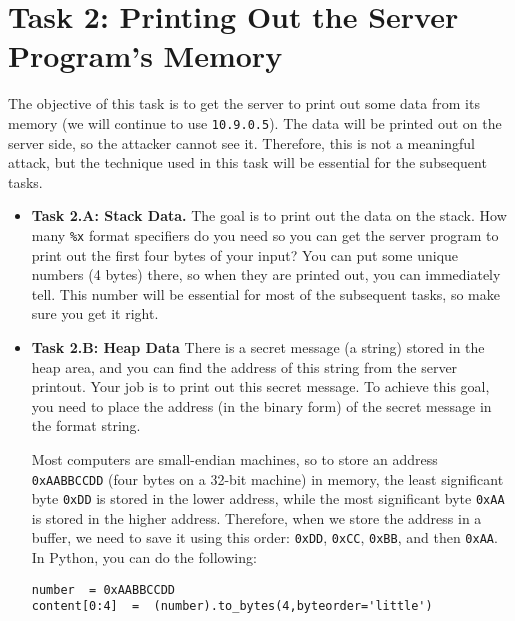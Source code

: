 \section{Task 2: Printing Out the Server Program's Memory}

The objective of this task is to get the server to print out some data 
from its memory (we will continue to use \texttt{10.9.0.5}). 
The data will be printed out on the server side, so
the attacker cannot see it. Therefore, this is not a meaningful
attack, but the technique used in this task will be essential for 
the subsequent tasks. 


\begin{itemize} 
\item \textbf{Task 2.A: Stack Data.}
The goal is to print out the data on the stack.
How many \texttt{\%x} format specifiers do you need so you can get 
the server program to print out the first four bytes of your 
input? You can put some unique numbers (4 bytes) 
there, so when they are printed out, you can immediately tell. 
This number will be essential for most of the subsequent tasks, 
so make sure you get it right. 


\item \textbf{Task 2.B: Heap Data} 
There is a secret message (a string) stored in the heap area, and you can find 
the address of this string from the server printout. 
Your job is to print out this secret message. 
To achieve this goal, you need to place the address (in the binary form) 
of the secret message in the format string.

Most computers are small-endian machines, so to store
an address \texttt{0xAABBCCDD} (four bytes on a 32-bit machine) in memory, 
the least significant byte \texttt{0xDD} is stored in the lower address,
while the most significant byte \texttt{0xAA} is stored in the higher 
address. Therefore, when we store the address in a buffer, we need to 
save it using this order: \texttt{0xDD}, \texttt{0xCC}, \texttt{0xBB}, and 
then \texttt{0xAA}. In Python, you can do the following:

\begin{lstlisting}
number  = 0xAABBCCDD
content[0:4]  =  (number).to_bytes(4,byteorder='little')
\end{lstlisting}
     
\end{itemize} 






